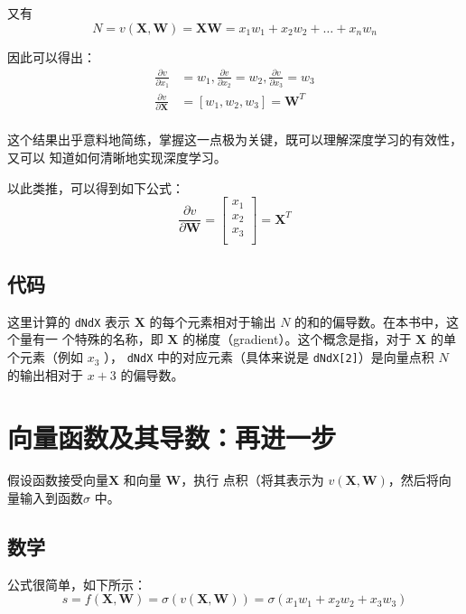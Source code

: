 又有$$N=v(\bm{X}, \bm{W})=\bm{X}\bm{W}=x_1w_1+x_2w_2+\dots+x_nw_n$$

因此可以得出：
\begin{equation*}
    \begin{aligned}
        \frac{\partial v}{\partial x_1}    & =w_1, \frac{\partial v}{\partial x_2}  =w_2, \frac{\partial v}{\partial x_3}=w_3 \\
        \frac{\partial v}{\partial \bm{X}} & =
        \left[
            w_1, w_2, w_3
        \right]=\bm{W}^T                                                                                                      \\
    \end{aligned}
\end{equation*}

这个结果出乎意料地简练，掌握这一点极为关键，既可以理解深度学习的有效性，又可以
知道如何清晰地实现深度学习。

以此类推，可以得到如下公式：
\begin{equation*}
    \frac{\partial v}{\partial \bm{W}}=
    \left[
        \begin{matrix}
            x_1 \\
            x_2 \\
            x_3 \\
        \end{matrix}
        \right]=\bm{X}^T
\end{equation*}

\subsection*{代码}
这里计算的 \verb|dNdX| 表示 $\bm{X}$ 的每个元素相对于输出 $N$ 的和的偏导数。在本书中，这个量有一
个特殊的名称，即 $\bm{X}$ 的梯度（gradient）。这个概念是指，对于 $\bm{X}$ 的单个元素（例如
$x_3$ ），
\verb|dNdX| 中的对应元素（具体来说是 \verb|dNdX[2]|）是向量点积 $N$ 的输出相对于
$x+3$ 的偏导数。
\section{向量函数及其导数：再进一步}
假设函数接受向量$\bm{X}$ 和向量 $\bm{W}$，执行 点积（将其表示为 $v(\bm{X}, \bm{W}) $，然后将向量输入到函数$\sigma$ 中。
\subsection*{数学}
公式很简单，如下所示：
$$s = f (\bm{X}, \bm{W}) = \sigma( v(\bm{X}, \bm{W}))= \sigma(x_1w_1 + x_2  w_2 + x_3w_3)$$

